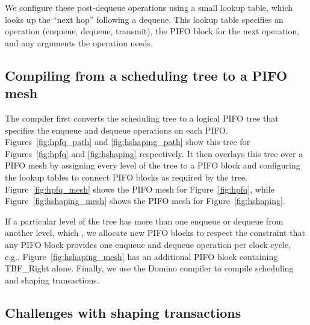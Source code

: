 We configure these post-dequeue operations using a small lookup table, which
looks up the ``next hop'' following a dequeue. This lookup table specifies an
operation (enqueue, dequeue, transmit), the PIFO block for the next operation,
and any arguments the operation needs.

\subsection{Compiling from a scheduling tree to a PIFO mesh}
\label{pifo_ss:compiler}


The compiler first converts the scheduling tree to a logical PIFO tree that
specifies the enqueue and dequeue operations on each PIFO.
Figures~\ref{fig:hpfq_path} and \ref{fig:hshaping_path} show this tree for
Figures~\ref{fig:hpfq} and \ref{fig:hshaping} respectively.  It then overlays
this tree over a PIFO mesh by assigning every level of the tree to a PIFO block
and configuring the lookup tables to connect PIFO blocks as required by the
tree.  Figure~\ref{fig:hpfq_mesh} shows the PIFO mesh for
Figure~\ref{fig:hpfq}, while Figure~\ref{fig:hshaping_mesh} shows the PIFO mesh
for Figure~\ref{fig:hshaping}.

If a particular level of the tree has more than one enqueue or dequeue from
another level, which , we allocate new PIFO blocks to respect the
constraint that any PIFO block provides one enqueue and dequeue operation per
clock cycle, e.g., Figure~\ref{fig:hshaping_mesh} has an additional PIFO block
containing TBF\_Right alone. Finally, we use the Domino compiler to compile
scheduling and shaping transactions.


\subsection{Challenges with shaping transactions}
\label{ss:shape_challenge}

